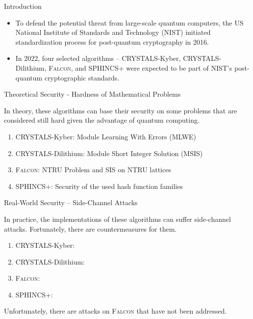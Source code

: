 \begin{frame}{Introduction}

\begin{itemize}
    \item To defend the potential threat from large-scale quantum computers, the US National Institute of Standards and Technology (NIST) initiated standardization process for post-quantum cryptography in 2016.
    \pause
    \item In 2022, four selected algorithms – CRYSTALS-Kyber, CRYSTALS-Dilithium, \textsc{Falcon}, and SPHINCS+ were expected to be part of NIST's post-quantum cryptographic standards.
\end{itemize}
    
\end{frame}


\begin{frame}{Theoretical Security - Hardness of Mathematical Problems}

In theory, these algorithms can base their security on some problems that are considered still hard given the advantage of quantum computing.

\begin{enumerate}
    \item CRYSTALS-Kyber: Module Learning With Errors (MLWE)
    \item CRYSTALS-Dilithium: Module Short Integer Solution (MSIS)
    \item \textsc{Falcon}: NTRU Problem and SIS on NTRU lattices
    \item SPHINCS+: Security of the used hash function families
\end{enumerate}

\end{frame}


\begin{frame}{Real-World Security – Side-Channel Attacks}

In practice, the implementations of these algorithms can suffer side-channel attacks. Fortunately, there are countermeasures for them.

\begin{enumerate}
    \item CRYSTALS-Kyber: \cite{TCHES:BGRSv21, TCHES:FBRKSVS22, EPRINT:HKLPSS22}
    \item CRYSTALS-Dilithium: \cite{ACNS:MGTF19}
    \item { \textsc{Falcon}: \cite{PQCRYPTO:HPRR20, TCHES:GMRR22, EC:ZLYW23} }
    \item SPHINCS+: \cite{bertoni2010building,IEEE:7223170}
\end{enumerate}
\pause
\medskip

Unfortunately, there are attacks on \textsc{Falcon} that have not been addressed.

\end{frame}


